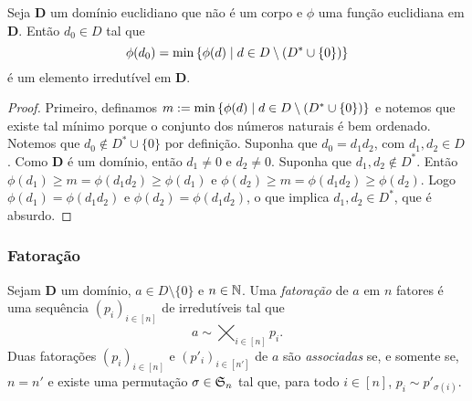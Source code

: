 \begin{prop}
	Seja $\bm D$ um domínio euclidiano que não é um corpo e $\phi$ uma função euclidiana em $\bm D$. Então $d_0 \in D$ tal que
	\begin{equation*}
	\phi(d_0) = \min\left\{\phi(d) \;\middle\vert\; d \in D \setminus (D^* \cup \{0\}) \right\}
	\end{equation*}
é um elemento irredutível em $\bm D$.
\end{prop}
\begin{proof}
Primeiro, definamos $m := \min\left\{\phi(d) \;\middle\vert\; d \in D \setminus (D^* \cup \{0\})  \right\}$ e notemos que existe tal mínimo porque o conjunto dos números naturais é bem ordenado. Notemos que $d_0 \notin D^* \cup \{0\}$ por definição. Suponha que $d_0 = d_1d_2$, com $d_1,d_2 \in D$. Como $\bm D$ é um domínio, então $d_1 \neq 0$ e $d_2 \neq 0$. Suponha que $d_1,d_2 \notin D^*$. Então $\phi(d_1) \geq m = \phi(d_1d_2) \geq \phi(d_1)$ e $\phi(d_2) \geq m = \phi(d_1d_2) \geq \phi(d_2)$. Logo $\phi(d_1)=\phi(d_1d_2)$ e $\phi(d_2)=\phi(d_1d_2)$, o que implica $d_1,d_2 \in D^*$, que é absurdo.
\end{proof}


\subsubsection{Fatoração}

\begin{defi}
Sejam $\bm D$ um domínio, $a \in D \setminus \{0\}$ e $n \in \mathbb{N}$. Uma \emph{fatoração} de $a$ em $n$ fatores é uma sequência $(p_i)_{i \in [n]}$ de irredutíveis tal que
	\begin{equation*}
	a \sim \bigtimes_{i \in [n]} p_i.
	\end{equation*}
Duas fatorações $(p_i)_{i \in [n]}$ e $(p'_i)_{i \in [n']}$ de $a$ são \emph{associadas} se, e somente se, $n=n'$ e existe uma permutação $\sigma \in \mathfrak{S}_n$ tal que, para todo $i \in [n]$, $p_i \sim p'_{\sigma(i)}$.
\end{defi}


